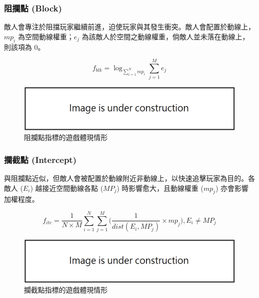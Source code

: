 \subsubsection{阻攔點 (Block)}
\label{sssec:method-segments-fitnesses-block}

敵人會專注於阻擋玩家繼續前進，迫使玩家與其發生衝突。敵人會配置於動線上，$mp_{i}$ 為空間動線權重；$e_j$ 為該敵人於空間之動線權重，倘敵人並未落在動線上，則該項為 0。

\begin{equation}
    f_{blk}=\log _{\sum_{i=1}^{N} mp_{i}} \sum_{j=1}^{M} e_{j}
\end{equation}

\begin{figure}[ht]
  \begin{center}
    \includegraphics[width=1.0\textwidth]{figures/under_construction.png}
    \caption{阻攔點指標的遊戲體現情形}
    \label{fig:fitnesses-block-gameplay}
  \end{center}
\end{figure}

\subsubsection{攔截點 (Intercept)}
\label{sssec:method-segments-fitnesses-intercept}

與阻攔點近似，但敵人會被配置於動線附近非動線上，以快速追擊玩家為目的。各敵人 ($E_{i}$) 越接近空間動線各點 ($MP_{j}$) 時影響愈大，且動線權重 ($mp_{j}$) 亦會影響加權程度。

\begin{equation}
    f_{itc} = \frac{1}{N \times M} \sum_{i=1}^{N} \sum_{j=1}^{M} \Big( \frac{1}{dist(E_{i}, MP_{j})} \times mp_{j} \Big), 
    E_{i} \neq MP_{j}
\end{equation}

\begin{figure}[ht]
  \begin{center}
    \includegraphics[width=1.0\textwidth]{figures/under_construction.png}
    \caption{攔截點指標的遊戲體現情形}
    \label{fig:fitnesses-intercept-gameplay}
  \end{center}
\end{figure}

